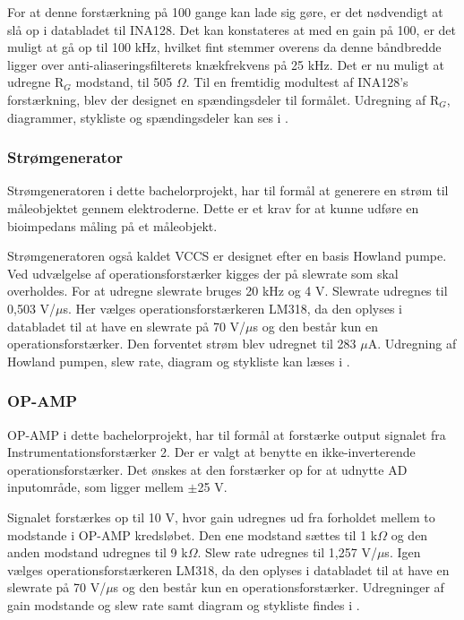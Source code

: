 For at denne forstærkning på 100 gange kan lade sig gøre, er det nødvendigt at slå op i databladet til INA128. Det kan konstateres at med en gain på 100, er det muligt at gå op til 100 kHz, hvilket fint stemmer overens da denne båndbredde  ligger over anti-aliaseringsfilterets knækfrekvens på 25 kHz. Det er nu muligt at udregne R$_{G}$ modstand, til 505 $\Omega$. Til en fremtidig modultest af INA128's forstærkning, blev der designet en spændingsdeler til formålet. Udregning af R$_{G}$, diagrammer, stykliste og spændingsdeler kan ses i .

 
 
\subsubsection{Strømgenerator}
Strømgeneratoren i dette bachelorprojekt, har til formål at generere en strøm til måleobjektet gennem elektroderne. Dette er et krav for at kunne udføre en bioimpedans måling på et måleobjekt\cite{Brantlov2017}. 

Strømgeneratoren også kaldet VCCS er designet efter en basis Howland pumpe. Ved udvælgelse af operationsforstærker kigges der på slewrate som skal overholdes. For at udregne slewrate bruges 20 kHz og 4 V. Slewrate udregnes til 0,503 V/$\mu$s. Her vælges operationsforstærkeren LM318, da den oplyses i databladet til at have en slewrate på 70 V/$\mu$s og den består kun en operationsforstærker. Den forventet strøm blev udregnet til 283 $\mu$A. Udregning af Howland pumpen, slew rate, diagram og stykliste kan læses i .


\subsubsection{OP-AMP}
OP-AMP i dette bachelorprojekt, har til formål at forstærke output signalet fra Instrumentationsforstærker 2. Der er valgt at benytte en ikke-inverterende operationsforstærker. Det ønskes at den forstærker op for at udnytte AD inputområde, som ligger mellem $\pm$25 V. 

Signalet forstærkes op til 10 V, hvor gain udregnes ud fra forholdet mellem to modstande i OP-AMP kredsløbet. Den ene modstand sættes til 1 k$\Omega$ og den anden modstand udregnes til 9 k$\Omega$. Slew rate udregnes til 1,257 V/$\mu$s. Igen vælges operationsforstærkeren LM318, da den oplyses i databladet til at have en slewrate på 70 V/$\mu$s og den består kun en operationsforstærker. Udregninger af gain modstande og slew rate samt diagram og stykliste findes i .


